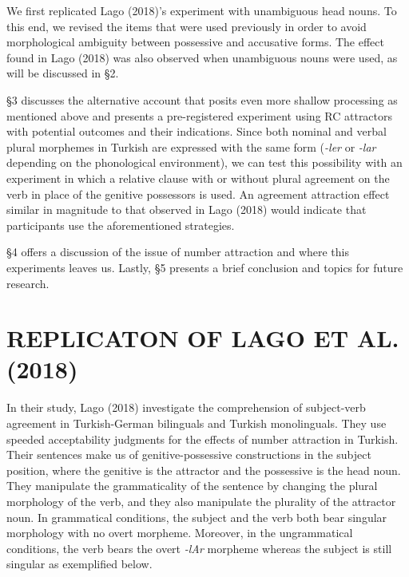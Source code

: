 \documentclass[11pt,a4paper]{article}
\begin{document}
We first replicated Lago (2018)'s experiment with unambiguous head
nouns. To this end, we revised the items that were used previously in
order to avoid morphological ambiguity between possessive and accusative
forms. The effect found in Lago (2018) was also observed when
unambiguous nouns were used, as will be discussed in \S 2.

\S 3 discusses the alternative account that posits even more shallow
processing as mentioned above and presents a pre-registered experiment
using RC attractors with potential outcomes and their indications. Since
both nominal and verbal plural morphemes in Turkish are expressed with
the same form (\emph{-ler} or \emph{-lar} depending on the phonological
environment), we can test this possibility with an experiment in which a
relative clause with or without plural agreement on the verb in place of
the genitive possessors is used. An agreement attraction effect similar
in magnitude to that observed in Lago (2018) would indicate that
participants use the aforementioned strategies.

\S 4 offers a discussion of the issue of number attraction and where
this experiments leaves us. Lastly, \S 5 presents a brief conclusion and
topics for future research.

\hypertarget{replicaton-of-lago-et-al.-2018}{%
\section{REPLICATON OF LAGO ET AL.
(2018)}\label{replicaton-of-lago-et-al.-2018}}

In their study, Lago (2018) investigate the comprehension of
subject-verb agreement in Turkish-German bilinguals and Turkish
monolinguals. They use speeded acceptability judgments for the effects
of number attraction in Turkish. Their sentences make us of
genitive-possessive constructions in the subject position, where the
genitive is the attractor and the possessive is the head noun. They
manipulate the grammaticality of the sentence by changing the plural
morphology of the verb, and they also manipulate the plurality of the
attractor noun. In grammatical conditions, the subject and the verb both
bear singular morphology with no overt morpheme. Moreover, in the
ungrammatical conditions, the verb bears the overt \emph{-lAr} morpheme
whereas the subject is still singular as exemplified below.
\end{document}
